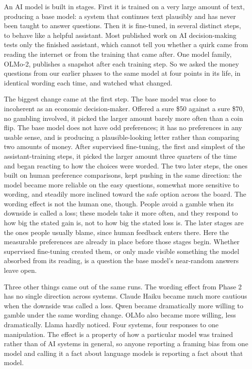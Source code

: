 \documentclass[11pt]{article}
\begin{document}
An AI model is built in stages. First it is trained on a very large amount of text, producing a base
model: a system that continues text plausibly and has never been taught to answer questions. Then it
is fine-tuned, in several distinct steps, to behave like a helpful assistant. Most published work on
AI decision-making tests only the finished assistant, which cannot tell you whether a quirk came from
reading the internet or from the training that came after. One model family, OLMo-2, publishes a
snapshot after each training step. So we asked the money questions from our earlier phases to the same
model at four points in its life, in identical wording each time, and watched what changed.

The biggest change came at the first step. The base model was close to incoherent as an economic
decision-maker. Offered a sure \$50 against a sure \$70, no gambling involved, it picked the larger
amount barely more often than a coin flip. The base model does not have odd preferences; it has no
preferences in any usable sense, and is producing a plausible-looking letter rather than comparing two
amounts of money. After supervised fine-tuning, the first and simplest of the assistant-training
steps, it picked the larger amount three quarters of the time and began reacting to how the choices
were worded. The two later steps, the ones built on human preference comparisons, kept pushing in the
same direction: the model became more reliable on the easy questions, somewhat more sensitive to
wording, and steadily more inclined toward the safe option across the board. The wording effect is not
the human one, though. People avoid a gamble when its downside is called a loss; these models take it
more often, and they respond to how big the stated gain is, not to how big the stated loss is. The later stages are the ones people usually blame, since
human feedback enters there. Here the measurable preferences are already in place before those stages
begin. Whether supervised fine-tuning created them, or only made visible something the model absorbed
from its reading, is a question the base model's near-random answers leave open.

Three other things came out of the same runs. The wording effect from Phase 2 has no single direction
across systems. Claude Haiku became much more cautious when the downside was called a loss. Qwen became
dramatically more willing to gamble under the same wording change. OLMo also became more willing, less
dramatically. Llama hardly noticed. Four systems, four responses to one manipulation. The effect is a
property of how a particular model was trained rather than of AI systems in general, so anyone
reporting a framing bias from one model and calling it a fact about language models is reporting a fact
about that model.
\end{document}

